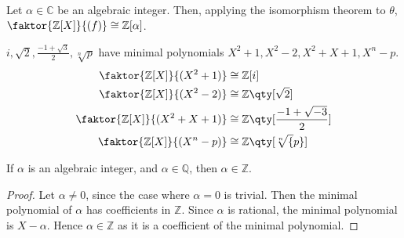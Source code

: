 Let $\alpha \in \mathbb C$ be an algebraic integer.
Then, applying the isomorphism theorem to $\theta$, $\faktor{\mathbb Z[X]}{(f)} \cong \mathbb Z[\alpha]$.

\begin{example}
	$i, \sqrt{2}, \frac{-1 + \sqrt{3}}{2}, \sqrt[n]{p}$ have minimal polynomials $X^2 + 1, X^2 - 2, X^2 + X + 1, X^n - p$.
	\begin{align*}
		\faktor{\mathbb Z[X]}{(X^2 + 1)}     & \cong \mathbb Z[i]                          \\
		\faktor{\mathbb Z[X]}{(X^2 - 2)}     & \cong \mathbb Z\qty[\sqrt{2}]               \\
		\faktor{\mathbb Z[X]}{(X^2 + X + 1)} & \cong \mathbb Z\qty[\frac{-1+\sqrt{-3}}{2}] \\
		\faktor{\mathbb Z[X]}{(X^n - p)}     & \cong \mathbb Z\qty[\sqrt[n]{p}]
	\end{align*}
\end{example} 

\begin{corollary} \label{cor:12.5}
	If $\alpha$ is an algebraic integer, and $\alpha \in \mathbb Q$, then $\alpha \in \mathbb Z$.
\end{corollary}

\begin{proof}
	Let $\alpha \neq 0$, since the case where $\alpha = 0$ is trivial.
	Then the minimal polynomial of $\alpha$ has coefficients in $\mathbb Z$.
	Since $\alpha$ is rational, the minimal polynomial is $X - \alpha$.
	Hence $\alpha \in \mathbb Z$ as it is a coefficient of the minimal polynomial.
\end{proof}
